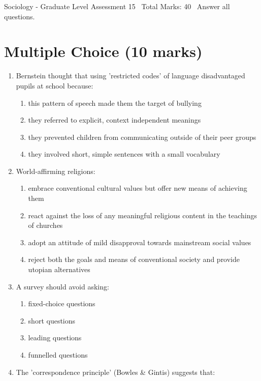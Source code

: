 \documentclass[12pt]{article}
\begin{document}
\begin{center}
Sociology - Graduate Level Assessment 15 \
Total Marks: 40 \
Answer all questions.
\end{center}

\section*{Multiple Choice (10 marks)}
\begin{enumerate}[label=\arabic*.]
\item Bernstein thought that using 'restricted codes' of language disadvantaged pupils at school because:
\begin{enumerate}[label=(\alph*)]
    \item this pattern of speech made them the target of bullying
    \item they referred to explicit, context independent meanings
    \item they prevented children from communicating outside of their peer groups
    \item they involved short, simple sentences with a small vocabulary
\end{enumerate}
\item World-affirming religions:
\begin{enumerate}[label=(\alph*)]
    \item embrace conventional cultural values but offer new means of achieving them
    \item react against the loss of any meaningful religious content in the teachings of churches
    \item adopt an attitude of mild disapproval towards mainstream social values
    \item reject both the goals and means of conventional society and provide utopian alternatives
\end{enumerate}
\item A survey should avoid asking:
\begin{enumerate}[label=(\alph*)]
    \item fixed-choice questions
    \item short questions
    \item leading questions
    \item funnelled questions
\end{enumerate}
\item The 'correspondence principle' (Bowles \& Gintis) suggests that:
\begin{enumerate}[label=(\alph*)]

\end{enumerate}
\end{enumerate}
\end{document}
